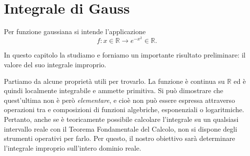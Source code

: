 
\chapter{Integrale di Gauss}

\begin{Def}
	Per funzione gaussiana si intende l'applicazione
	\begin{equation*}
		f: x \in \mathbb{R} \to e^{-x^2} \in \mathbb{R}.
	\end{equation*}
\end{Def}

In questo capitolo la studiamo e forniamo un importante risultato preliminare: il valore del suo integrale improprio.

Partiamo da alcune proprietà utili per trovarlo. La funzione è continua su $ \mathbb{R}$ ed è quindi localmente integrabile e ammette primitiva. 
Si può dimostrare che quest'ultima non è però \textit{elementare}, e cioè non può essere espressa attraverso operazioni tra e composizioni di funzioni algebriche, esponenziali o logaritmiche. 
Pertanto, anche se è teoricamente possibile calcolare l'integrale su un qualsiasi intervallo reale con il Teorema Fondamentale del Calcolo, non si dispone degli strumenti operativi per farlo. 
Per questo, il nostro obiettivo sarà determinare l'integrale improprio sull'intero dominio reale.

